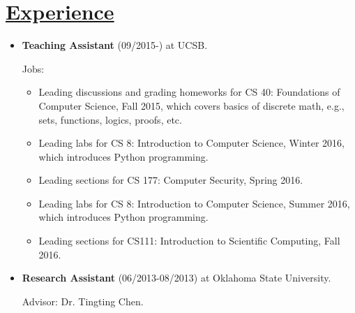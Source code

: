 \documentclass{article}
\newlength{\nL}
\newcommand{\underLineText}[1]{\settowidth{\nL}{#1}\setlength{\nL}{0.95\textwidth-\nL}\underline{{\sc #1}\hspace{\nL}}}
\begin{document}
\section*{\underLineText{Experience}}
\begin{itemize}
\item {\bf Teaching Assistant} (09/2015-) at UCSB.

Jobs: 
	\begin{itemize}
	\item Leading discussions and grading homeworks for CS 40: Foundations of Computer Science, Fall 2015, which covers basics of discrete math, e.g., sets, functions, logics, proofs, etc.
	\item Leading labs for CS 8: Introduction to Computer Science, Winter 2016, which introduces Python programming.
	\item Leading sections for CS 177: Computer Security, Spring 2016.
	\item Leading labs for CS 8: Introduction to Computer Science, Summer 2016, which introduces Python programming.
	\item Leading sections for CS111: Introduction to Scientific Computing, Fall 2016.
	\end{itemize}
\item {\bf Research Assistant} (06/2013-08/2013) at Oklahoma State University.

Advisor: Dr. Tingting Chen.


\end{itemize}
\end{document}
